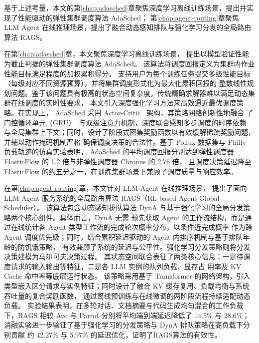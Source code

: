基于上述考量，本文的第\ref{chap:adasched}章聚焦深度学习离线训练场景，提出并实现了性能驱动的弹性集群调度算法 AdaSched；
第\ref{chap:agent-routing}章聚焦 LLM Agent 在线推理场景，提出了融合动态感知排队与强化学习分发的全局路由算法 RAGS。

在第\ref{chap:adasched}章，本文聚焦深度学习离线训练场景，
提出以模型验证性能为截止判据的弹性集群调度算法 AdaSched。
该算法将调度回报定义为集群内作业性能目标满足程度的加权累积得分，
支持用户为每个训练任务提交多级性能目标（每级对应不同资源预算），并将集群调度形式化为最大化累积回报的
整数线性规划问题。鉴于该问题具有极高的状态空间复杂度，传统精确求解器难以满足动态集群在线调度的实时性要求，
本文引入深度强化学习方法来高效逼近最优调度策略。在实现上，
AdaSched 采用 Actor-Critic~\cite{sutton1999policy} 架构，其策略网络创新性地融合
了门控循环单元（GRU）~\cite{cho2014learning}与双级注意力机制，深度联合感知多步调度的时序依赖
与全局集群上下文；同时，设计了阶段式密集奖励函数以有效缓解稀疏奖励问题，并辅以动作掩码机制严格
确保调度决策的合法性。基于 Pollux 数据集与 Philly~\cite{jeon2019analysis} 负载轨迹的仿真实验表明，
AdaSched 的平均调度回报分别达到弹性调度器 ElasticFlow 的 1.2 倍与非弹性调度器 Chronus 的 2.76 倍，
且调度决策延迟降至 ElasticFlow 的约五分之一，在训练集群场景下兼顾了调度质量与响应效率。

在第\ref{chap:agent-routing}章，本文针对 LLM Agent 在线推理场景，
提出了面向 LLM Agent 服务系统的全局路由算法 RAGS（RL-based Agent Global Scheduler）。
该算法包含动态感知排队算法 DynA 与基于强化学习的全局分发策略两个核心组件。具体而言，DynA 无需
预先获取 Agent 的工作流结构，而是通过在线统计各 Agent 类型工作流的完成轮次概率分布，以条件近完成概率
作为跨 Agent 调度优先级；同时，结合累积延迟驱动的 Agent 内排序机制与基于排队年龄的防饥饿策略，
有效兼顾了系统的延迟与公平性。强化学习分发策略则将分发决策建模为马尔可夫决策过程。
其状态空间联合表征了两类核心信息：一是待调度请求的输入输出等特征，二是各 LLM 实例的队列负载、显存占
用率及 KV Cache 命中率等底层运行状态。
该策略采用基于 Transformer 的网络架构，引入类型嵌入区分请求与实例特征；同时设计了融合 KV 缓存复用、负载均衡与系统吞吐量的复合奖励函数，
通过离线预训练与在线微调的两阶段流程持续适配动态负载。
实验结果表明，在多轮对话、文档摘要与代码生成均匀混合的工作负载下，RAGS 相较 Ayo 与 Parrot 分别将平均端到端延迟降低了 $14.5\%$ 与 $28.6\%$；
消融实验进一步验证了基于强化学习的分发策略与 DynA 排队策略在高负载下分别贡献
约 42.27\% 与 5.97\% 的延迟优化，证明了RAGS算法的有效性。

